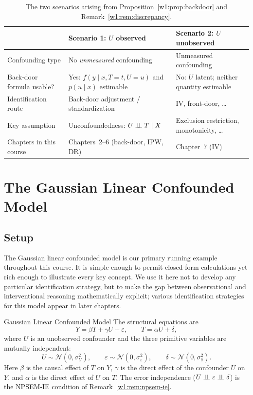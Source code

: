 \documentclass[master.tex]{subfiles}
\begin{document}
\begin{table}[h]
\centering
\renewcommand{\arraystretch}{1.5}
\caption{The two scenarios arising from
Proposition~\ref{w1:prop:backdoor} and Remark~\ref{w1:rem:discrepancy}.}
\label{w1:tab:scenarios}
\begin{tabular}{@{}lll@{}}
\toprule
& \textbf{Scenario 1: $U$ observed} & \textbf{Scenario 2: $U$ unobserved} \\
\midrule
Confounding type
  & No \emph{unmeasured} confounding
  & Unmeasured confounding \\
Back-door formula usable?
  & Yes: $f(y\mid x,T{=}t,U{=}u)$ and $p(u\mid x)$ estimable
  & No: $U$ latent; neither quantity estimable \\
Identification route
  & Back-door adjustment / standardization
  & IV, front-door, \ldots \\
Key assumption
  & Unconfoundedness: $U \perp\!\!\!\perp T \mid X$
  & Exclusion restriction, monotonicity, \ldots \\
Chapters in this course
  & Chapters~2--6 (back-door, IPW, DR)
  & Chapter~7 (IV) \\
\bottomrule
\end{tabular}
\end{table}

\section{The Gaussian Linear Confounded Model}
\label{w1:sec:iv}

\subsection{Setup}

The Gaussian linear confounded model is our primary running example
throughout this course.  It is simple enough to permit closed-form
calculations yet rich enough to illustrate every key concept.  We use it
here not to develop any particular identification strategy, but to make
the gap between observational and interventional reasoning mathematically
explicit; various identification strategies for this model appear in
later chapters.

\begin{example}{Gaussian Linear Confounded Model}
\label{w1:ex:ivmodel}
The structural equations are
\begin{equation}
  Y = \beta T + \gamma U + \varepsilon, \qquad T = \alpha U + \delta,
  \label{w1:eq:iv}
\end{equation}
where $U$ is an unobserved confounder and the three primitive variables
are mutually independent:
\[
  U \sim \mathcal{N}(0,\sigma_U^2), \qquad
  \varepsilon \sim \mathcal{N}(0,\sigma_\varepsilon^2), \qquad
  \delta \sim \mathcal{N}(0,\sigma_\delta^2).
\]
Here $\beta$ is the causal effect of $T$ on $Y$, $\gamma$ is the direct
effect of the confounder $U$ on $Y$, and $\alpha$ is the direct effect
of $U$ on $T$.  The error independence ($U \perp\!\!\!\perp \varepsilon \perp\!\!\!\perp
\delta$) is the NPSEM-IE condition of Remark~\ref{w1:rem:npsem-ie}.
\end{example}
\end{document}
